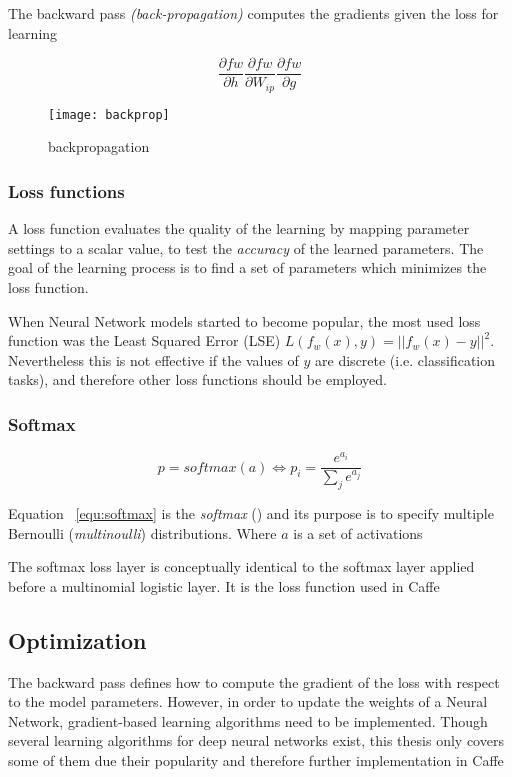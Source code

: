 The backward pass \textit{(back-propagation)} computes the gradients given the loss for learning

\begin{equation}
 \frac{\partial{fw}}{\partial{h}} \frac{\partial{fw}}{\partial{W_{ip}}} \frac{\partial{fw}}{\partial{g}}
\end{equation}

\begin{figure}
 \centering
 \texttt{[image: backprop]}
 \caption{backpropagation}
\end{figure}
\subsubsection{Loss functions}
\label{sec:loss}
A loss function evaluates the quality of the learning by mapping parameter settings to a scalar value, to test the \textit{accuracy} of the learned parameters. The goal of the learning process is to find a set of parameters which minimizes the loss function.

When Neural Network models started to become popular, the most used loss function was the Least Squared Error (LSE) $L(f_w(x),y) = ||f_w(x)-y||^2$. Nevertheless this is not effective if the values of $y$ are discrete (i.e. classification tasks), and therefore other loss functions should be employed.

\subsubsection{Softmax}
\label{sec:softmax}
\begin{equation}
 p = softmax(a) \Longleftrightarrow p_i = \frac{e^{a_i}}{\sum_j e^{a_j}}
 \label{equ:softmax}
\end{equation}

Equation ~\ref{equ:softmax} is the \textit{softmax} (\textcite{bridle1990probabilistic}) and its purpose is to specify multiple Bernoulli (\textit{multinoulli}) distributions. Where $a$ is a set of activations 

The softmax loss layer is conceptually identical to the softmax layer applied before a multinomial logistic layer. It is the loss function used in Caffe



\subsection{Optimization}
The backward pass defines how to compute the gradient of the loss with respect to the model parameters. However, in order to update the weights of a Neural Network, gradient-based learning algorithms need to be implemented. 
Though several learning algorithms for deep neural networks exist, this thesis only covers some of them due their popularity and therefore further implementation in Caffe
